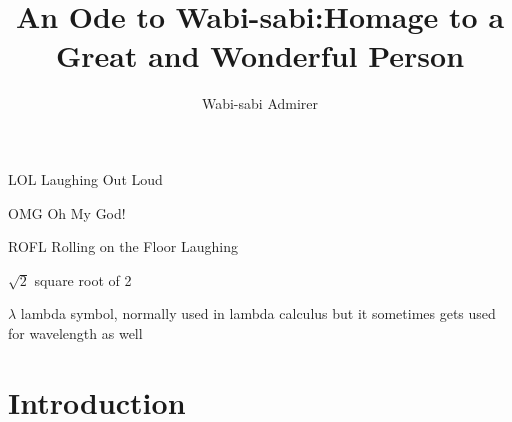 \documentclass[dissertation]{bsu-cs}  %
\title{An Ode to Wabi-sabi:\titleBreak Homage to a Great and Wonderful Person}
\author{Wabi-sabi Admirer}
\begin{document}
\frontmatter  %

\buildFrontPages %

\begin{listAbbreviations}
  \item[LOL] Laughing Out Loud
  \item[OMG] Oh My God!
  \item[ROFL] Rolling on the Floor Laughing
\end{listAbbreviations}


\begin{listSymbols}
  \item[$\sqrt{2}$] square root of 2
  \item[$\lambda$] lambda symbol, normally used in lambda calculus but
    it sometimes gets used for wavelength as well
\end{listSymbols}



\mainmatter


%
%

\chapter{Introduction}

%
%
\end{document}
